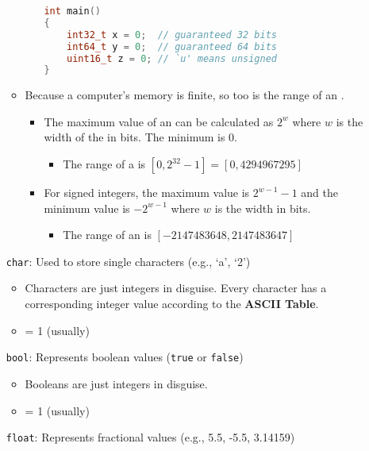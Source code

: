 \documentclass{article}
\begin{document}
\begin{itemize}
\begin{itemize}
\begin{itemize}
\begin{lstlisting}[language=C++]
int main()
{
	int32_t x = 0;  // guaranteed 32 bits
	int64_t y = 0;  // guaranteed 64 bits
	uint16_t z = 0; // `u' means unsigned
}
\end{lstlisting}
		\end{itemize}
		\item Because a computer's memory is finite, so too is the range of an .
		\begin{itemize}
			\item The maximum value of an  can be calculated as $2^w$ where $w$ is the width of the  in bits. The minimum is 0.
			\begin{itemize}
				\item The range of a  is $[0, 2^{32}-1]=[0, 4294967295]$
			\end{itemize}
			\item For signed integers, the maximum value is $2^{w-1}-1$ and the minimum value is $-2^{w-1}$ where $w$ is the width in bits.
			\begin{itemize}
				\item The range of an  is $[-2147483648, 2147483647]$
			\end{itemize}
		\end{itemize}
	\end{itemize}
	\item[\textcolor{BurntOrange}{\texttt{char}}:] Used to store single characters (e.g., `a', `2')
	\begin{itemize}
		\item Characters are just integers in disguise. Every character has a corresponding integer value according to the \textbf{ASCII Table}.
		\item {} = 1 (usually)
	\end{itemize}
	\item[\textcolor{BurntOrange}{\texttt{bool}}:] Represents boolean values (\texttt{true} or \texttt{false})
	\begin{itemize}
		\item Booleans are just integers in disguise.
		\item {} = 1 (usually)
	\end{itemize}
	\item[\textcolor{BurntOrange}{\texttt{float}}:] Represents fractional values (e.g., 5.5, -5.5, 3.14159)

\end{itemize}
\end{document}
